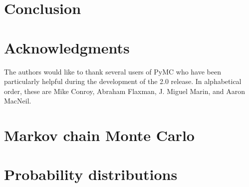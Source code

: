 \documentclass[]{jss_mod}
\begin{document}
\section{Conclusion}
\label{conclusion}


\section[Acknowledgments]{Acknowledgments}
\label{sec:acknowledge}
The authors would like to thank several users of PyMC who have been particularly helpful during the development of the 2.0 release. In alphabetical order, these are Mike Conroy, Abraham Flaxman, J. Miguel Marin, and Aaron MacNeil.

\appendix
\section[MCMC]{Markov chain Monte Carlo}
\label{sec:MCMC}


\section[Distributions]{Probability distributions}
\label{sec:distributions}


\nocite{Bernardo:1992fk}

\end{document}
